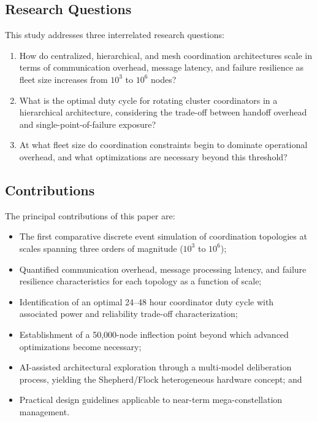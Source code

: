 \documentclass[journal]{IEEEtran}
\begin{document}
\subsection{Research Questions}

This study addresses three interrelated research questions:

\begin{enumerate}
    \item[\textbf{RQ1:}] How do centralized, hierarchical, and mesh coordination architectures scale in terms of communication overhead, message latency, and failure resilience as fleet size increases from $10^3$ to $10^6$ nodes?
    \item[\textbf{RQ2:}] What is the optimal duty cycle for rotating cluster coordinators in a hierarchical architecture, considering the trade-off between handoff overhead and single-point-of-failure exposure?
    \item[\textbf{RQ3:}] At what fleet size do coordination constraints begin to dominate operational overhead, and what optimizations are necessary beyond this threshold?
\end{enumerate}

\subsection{Contributions}

The principal contributions of this paper are:
\begin{itemize}
    \item The first comparative discrete event simulation of coordination topologies at scales spanning three orders of magnitude ($10^3$ to $10^6$);
    \item Quantified communication overhead, message processing latency, and failure resilience characteristics for each topology as a function of scale;
    \item Identification of an optimal 24--48 hour coordinator duty cycle with associated power and reliability trade-off characterization;
    \item Establishment of a 50{,}000-node inflection point beyond which advanced optimizations become necessary;
    \item AI-assisted architectural exploration through a multi-model deliberation process, yielding the Shepherd/Flock heterogeneous hardware concept; and
    \item Practical design guidelines applicable to near-term mega-constellation management.
\end{itemize}
\end{document}
